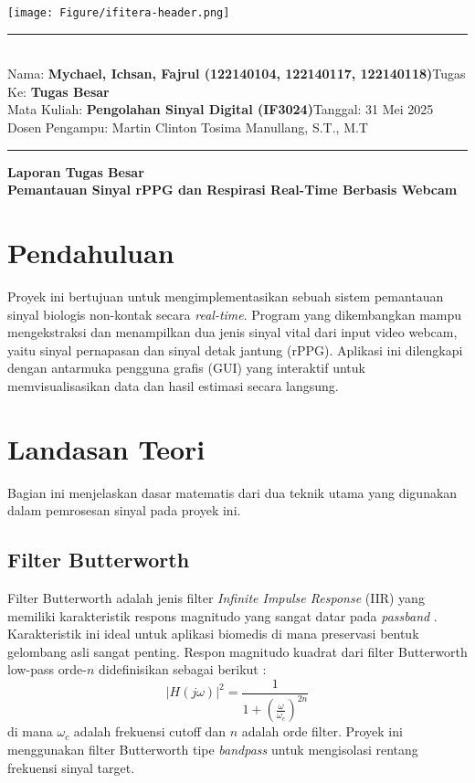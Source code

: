 \documentclass[11pt,a4paper]{article}
\newcommand{\student}{\textbf{Mychael, Ichsan, Fajrul (122140104, 122140117, 122140118)}}
\newcommand{\course}{\textbf{Pengolahan Sinyal Digital (IF3024)}}
\newcommand{\assignment}{\textbf{Tugas Besar}}
\begin{document}
\thispagestyle{empty}
\begin{center}
	\texttt{[image: Figure/ifitera-header.png]}
	\vspace{0.1cm}
\end{center}
\noindent
\rule{17cm}{0.2cm}\\[0.3cm]
Nama: \student \hfill Tugas Ke: \assignment\\[0.1cm]
Mata Kuliah: \course \hfill Tanggal: 31 Mei 2025\\
Dosen Pengampu: Martin Clinton Tosima Manullang, S.T., M.T\\
\rule{17cm}{0.05cm}
\vspace{1cm}

\begin{center}
    {\Large \bf Laporan Tugas Besar} \\
    \vspace{0.2cm}
    {\bf Pemantauan Sinyal rPPG dan Respirasi Real-Time Berbasis Webcam}
\end{center}
\vspace{0.5cm}

\tableofcontents
\newpage

\section{Pendahuluan}
Proyek ini bertujuan untuk mengimplementasikan sebuah sistem pemantauan sinyal biologis non-kontak secara \textit{real-time}. Program yang dikembangkan mampu mengekstraksi dan menampilkan dua jenis sinyal vital dari input video webcam, yaitu sinyal pernapasan dan sinyal detak jantung (rPPG). Aplikasi ini dilengkapi dengan antarmuka pengguna grafis (GUI) yang interaktif untuk memvisualisasikan data dan hasil estimasi secara langsung.

\section{Landasan Teori}
Bagian ini menjelaskan dasar matematis dari dua teknik utama yang digunakan dalam pemrosesan sinyal pada proyek ini.

\subsection{Filter Butterworth}
Filter Butterworth adalah jenis filter \textit{Infinite Impulse Response} (IIR) yang memiliki karakteristik respons magnitudo yang sangat datar pada \textit{passband} \cite{proakis2007}. Karakteristik ini ideal untuk aplikasi biomedis di mana preservasi bentuk gelombang asli sangat penting. Respon magnitudo kuadrat dari filter Butterworth low-pass orde-$n$ didefinisikan sebagai berikut \cite{oppenheim2010}:
\begin{equation}
|H(j\omega)|^2 = \frac{1}{1 + \left(\frac{\omega}{\omega_c}\right)^{2n}}
\end{equation}
di mana $\omega_c$ adalah frekuensi cutoff dan $n$ adalah orde filter. Proyek ini menggunakan filter Butterworth tipe \textit{bandpass} untuk mengisolasi rentang frekuensi sinyal target.
\end{document}
